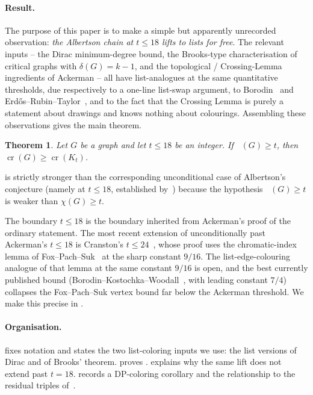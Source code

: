 \documentclass[11pt,a4paper]{article}
\newtheorem{theorem}{Theorem}
\theoremstyle{definition}
\DeclareMathOperator{\crN}{cr}
\DeclareMathOperator{\chl}{\chi_{\ell}}
\begin{document}
\paragraph{Result.}
The purpose of this paper is to make a simple but apparently
unrecorded observation: \emph{the Albertson chain at $t \le 18$
lifts to lists for free}. The relevant inputs -- the Dirac
minimum-degree bound, the Brooks-type characterisation of critical
graphs with $\delta(G) = k - 1$, and the topological / Crossing-Lemma
ingredients of Ackerman -- all have list-analogues at the same
quantitative thresholds, due respectively to a one-line list-swap
argument, to Borodin~\cite{Borodin1977} and Erd\H{o}s--Rubin--Taylor~\cite{ERT},
and to the fact that the Crossing Lemma is purely a statement about
drawings and knows nothing about colourings. Assembling these
observations gives the main theorem.

\begin{theorem}\label{thm:main}
Let $G$ be a graph and let $t \le 18$ be an integer. If
$\chl(G) \ge t$, then $\crN(G) \ge \crN(K_t)$.
\end{theorem}

 is strictly stronger than the corresponding
unconditional case of Albertson's conjecture (namely
 at $t \le 18$, established by~\cite{Ackerman})
because the hypothesis $\chl(G) \ge t$ is weaker than $\chi(G) \ge t$.

The boundary $t \le 18$ is the boundary inherited from Ackerman's
proof of the ordinary statement. The most recent extension of
 unconditionally past Ackerman's $t \le 18$ is
Cranston's $t \le 24$~\cite{Cranston}, whose proof uses the
chromatic-index lemma of Fox--Pach--Suk~\cite[Lemma 2.3]{FPS} at the
sharp constant $9/16$. The list-edge-colouring analogue of that
lemma at the same constant $9/16$ is open, and the best currently
published bound (Borodin--Kostochka--Woodall~\cite{BKW}, with leading
constant $7/4$) collapses the Fox--Pach--Suk vertex bound far below
the Ackerman threshold. We make this precise in
.

\paragraph{Organisation.}
 fixes notation and states the two list-coloring
inputs we use: the list versions of Dirac and of Brooks' theorem.
 proves . 
explains why the same lift does not extend past $t = 18$.
 records a DP-coloring corollary and the
relationship to the residual triples of~\cite{Cranston}.
\end{document}
